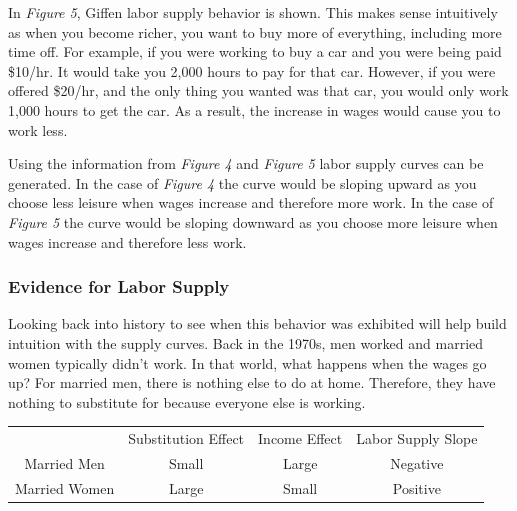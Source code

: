 \documentclass{article}
\begin{document}
In \textit{Figure 5}, Giffen labor supply behavior is shown. This makes sense
intuitively as when you become richer, you want to buy more of everything,
including more time off. For example, if you were working to buy a car and you
were being paid \$10/hr. It would take you 2,000 hours to pay for that car.
However, if you were offered \$20/hr, and the only thing you wanted was that
car, you would only work 1,000 hours to get the car. As a result, the increase
in wages would cause you to work less.

Using the information from \textit{Figure 4} and \textit{Figure 5} labor supply
curves can be generated. In the case of \textit{Figure 4} the curve would be
sloping upward as you choose less leisure when wages increase and therefore more
work. In the case of \textit{Figure 5} the curve would be sloping downward as
you choose more leisure when wages increase and therefore less work.

\subsubsection{Evidence for Labor Supply}

Looking back into history to see when this behavior was exhibited will help
build intuition with the supply curves. Back in the 1970s, men worked and
married women typically didn't work. In that world, what happens when the wages
go up? For married men, there is nothing else to do at home. Therefore, they
have nothing to substitute for because everyone else is working.

\begin{center}
    \begin{tabular}{c c c c}
        & Substitution Effect & Income Effect & Labor Supply Slope \\
        Married Men & Small & Large & Negative \\
        Married Women & Large & Small & Positive 
    \end{tabular}
\end{center}
\end{document}
